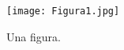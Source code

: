 \begin{figure}[htbp] 
\centering 
\texttt{[image: Figura1.jpg]} 
\caption{Una figura.} 
\label{fig:Homepage} 
\end{figure}
